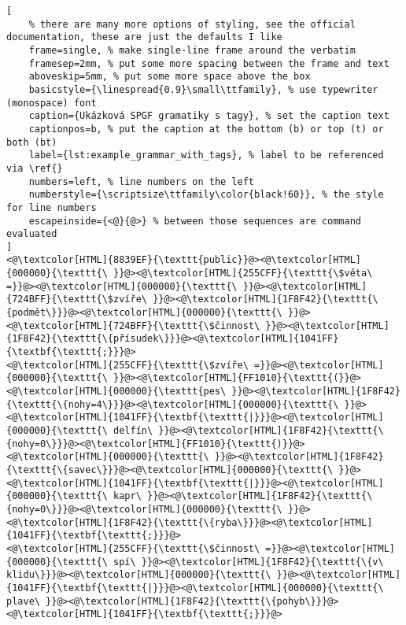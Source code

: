 \begin{lstlisting}[
	% there are many more options of styling, see the official documentation, these are just the defaults I like
	frame=single, % make single-line frame around the verbatim
	framesep=2mm, % put some more spacing between the frame and text
	aboveskip=5mm, % put some more space above the box
	basicstyle={\linespread{0.9}\small\ttfamily}, % use typewriter (monospace) font
	caption={Ukázková SPGF gramatiky s tagy}, % set the caption text
	captionpos=b, % put the caption at the bottom (b) or top (t) or both (bt)
	label={lst:example_grammar_with_tags}, % label to be referenced via \ref{}
	numbers=left, % line numbers on the left
	numberstyle={\scriptsize\ttfamily\color{black!60}}, % the style for line numbers
	escapeinside={<@}{@>} % between those sequences are command evaluated
]
<@\textcolor[HTML]{8839EF}{\texttt{public}}@><@\textcolor[HTML]{000000}{\texttt{\ }}@><@\textcolor[HTML]{255CFF}{\texttt{\$věta\ =}}@><@\textcolor[HTML]{000000}{\texttt{\ }}@><@\textcolor[HTML]{724BFF}{\texttt{\$zvíře\ }}@><@\textcolor[HTML]{1F8F42}{\texttt{\{podmět\}}}@><@\textcolor[HTML]{000000}{\texttt{\ }}@><@\textcolor[HTML]{724BFF}{\texttt{\$činnost\ }}@><@\textcolor[HTML]{1F8F42}{\texttt{\{přísudek\}}}@><@\textcolor[HTML]{1041FF}{\textbf{\texttt{;}}}@>
<@\textcolor[HTML]{255CFF}{\texttt{\$zvíře\ =}}@><@\textcolor[HTML]{000000}{\texttt{\ }}@><@\textcolor[HTML]{FF1010}{\texttt{(}}@><@\textcolor[HTML]{000000}{\texttt{pes\ }}@><@\textcolor[HTML]{1F8F42}{\texttt{\{nohy=4\}}}@><@\textcolor[HTML]{000000}{\texttt{\ }}@><@\textcolor[HTML]{1041FF}{\textbf{\texttt{|}}}@><@\textcolor[HTML]{000000}{\texttt{\ delfín\ }}@><@\textcolor[HTML]{1F8F42}{\texttt{\{nohy=0\}}}@><@\textcolor[HTML]{FF1010}{\texttt{)}}@><@\textcolor[HTML]{000000}{\texttt{\ }}@><@\textcolor[HTML]{1F8F42}{\texttt{\{savec\}}}@><@\textcolor[HTML]{000000}{\texttt{\ }}@><@\textcolor[HTML]{1041FF}{\textbf{\texttt{|}}}@><@\textcolor[HTML]{000000}{\texttt{\ kapr\ }}@><@\textcolor[HTML]{1F8F42}{\texttt{\{nohy=0\}}}@><@\textcolor[HTML]{000000}{\texttt{\ }}@><@\textcolor[HTML]{1F8F42}{\texttt{\{ryba\}}}@><@\textcolor[HTML]{1041FF}{\textbf{\texttt{;}}}@>
<@\textcolor[HTML]{255CFF}{\texttt{\$činnost\ =}}@><@\textcolor[HTML]{000000}{\texttt{\ spí\ }}@><@\textcolor[HTML]{1F8F42}{\texttt{\{v\ klidu\}}}@><@\textcolor[HTML]{000000}{\texttt{\ }}@><@\textcolor[HTML]{1041FF}{\textbf{\texttt{|}}}@><@\textcolor[HTML]{000000}{\texttt{\ plave\ }}@><@\textcolor[HTML]{1F8F42}{\texttt{\{pohyb\}}}@><@\textcolor[HTML]{1041FF}{\textbf{\texttt{;}}}@>

\end{lstlisting}
